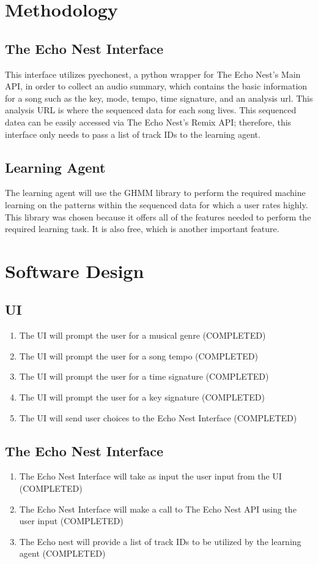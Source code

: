\documentclass{article}
\begin{document}
\section{Methodology}
\subsection{The Echo Nest Interface}
This interface utilizes pyechonest, a python wrapper for The Echo Nest's Main API, in order to collect an 
audio summary, which contains the basic information for a song such as the key, mode, tempo, time signature, 
and an analysis url. This analysis URL is where the sequenced data for each song lives. This sequenced datea
can be easily accessed via The Echo Nest's Remix API; therefore, this interface only needs to pass a list of
track IDs to the learning agent.

\subsection{Learning Agent}
The learning agent will use the GHMM library \cite{GHMM} to perform the required machine learning on the 
patterns within the sequenced data for which a user rates highly. This library was chosen because it offers 
all of the features needed to perform the required learning task. It is also free, which is another important 
feature.

\section{Software Design}
\subsection{UI}
\begin{enumerate}
\item The UI will prompt the user for a musical genre (COMPLETED)
\item The UI will prompt the user for a song tempo (COMPLETED)
\item The UI will prompt the user for a time signature (COMPLETED)
\item The UI will prompt the user for a key signature (COMPLETED)
\item The UI will send user choices to the Echo Nest Interface (COMPLETED)
\end{enumerate}

\subsection{The Echo Nest Interface}
\begin{enumerate}
\item The Echo Nest Interface will take as input the user input from the UI (COMPLETED)
\item The Echo Nest Interface will make a call to The Echo Nest API using the user input (COMPLETED)
\item The Echo nest will provide a list of track IDs to be utilized by the learning agent (COMPLETED)
\end{enumerate}
\end{document}
